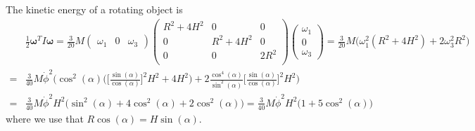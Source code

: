 \documentclass{article}
\begin{document}
        The kinetic energy of a rotating object is
        \begin{align*}
            &\frac{1}{2} \boldsymbol{\omega}^T I \boldsymbol{\omega} = \frac{3}{20} M
            \begin{pmatrix*}
                \omega_1 &
                0&
                \omega_3
            \end{pmatrix*}
            \begin{pmatrix}
                R^2 + 4H^2& 0 & 0 \\
                0 & R^2 + 4H^2& 0 \\
                0 & 0 & 2R^2\\
            \end{pmatrix}
            \begin{pmatrix*}
                \omega_1 \\
                0 \\
                \omega_3
            \end{pmatrix*}
            = \frac{3}{20} M \bigg(\omega_1^2 (R^2 + 4H^2) + 2\omega_3^2R^2\bigg) \\
            = &\frac{3}{40} M \dot \phi^2 \bigg(\cos^2(\alpha)\bigg(\bigg[\frac{\sin(\alpha)}{\cos(\alpha)}\bigg]^2H^2 + 4H^2\bigg) + 2\frac{\cos^4(\alpha)}{\sin^2(\alpha)}\bigg[\frac{\sin(\alpha)}{\cos(\alpha)}\bigg]^2H^2 \bigg) \\
            = &\frac{3}{40} M \dot \phi^2 H^2 \bigg(\sin^2(\alpha) + 4\cos^2(\alpha)+ 2 \cos^2(\alpha)\bigg) = \frac{3}{40} M \dot \phi^2 H^2 \bigg(1 + 5\cos^2(\alpha)\bigg)
        \end{align*}
        where we use that $R\cos(\alpha) =  H \sin(\alpha)$.
\end{document}
